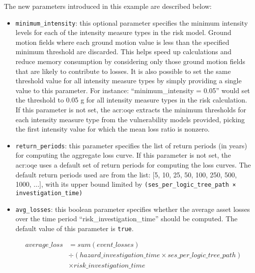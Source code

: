 The new parameters introduced in this example are described below:

\begin{itemize}

  \item \Verb+minimum_intensity+: this optional parameter specifies the minimum
    intensity levels for each of the intensity measure types in the risk model.
    Ground motion fields where each ground motion value is less than the 
    specified minimum threshold are discarded. This helps speed up calculations
    and reduce memory consumption by considering only those ground motion fields
    that are likely to contribute to losses. It is also possible to set the same
    threshold value for all intensity measure types by simply providing a single
    value to this parameter. For instance: ``minimum\_intensity = 0.05'' would
    set the threshold to 0.05 g for all intensity measure types in the risk 
    calculation.
    If this parameter is not set, the \glsdesc{acr:oqe} extracts the minimum
    thresholds for each intensity measure type from the vulnerability
    models provided, picking the first intensity value for which the mean loss
    ratio is nonzero.

  \item \Verb+return_periods+: this parameter specifies the list of return
    periods (in years) for computing the aggregate loss curve.
    If this parameter is not set, the \glsdesc{acr:oqe} uses a default set of
    return periods for computing the loss curves. The default return periods
    used are from the list: [5, 10, 25, 50, 100, 250, 500, 1000, ...], with 
    its upper bound limited by \Verb+(ses_per_logic_tree_path × investigation_time)+

  \item \Verb+avg_losses+: this boolean parameter specifies whether the average
    asset losses over the time period ``risk\_investigation\_time'' should be
    computed. The default value of this parameter is \Verb+true+.

    \begin{equation*}
    \begin{split}
    average\_loss & = sum(event\_losses) \\
                 & \div (hazard\_investigation\_time \times ses\_per\_logic\_tree\_path) \\
                 & \times risk\_investigation\_time
    \end{split}
    \end{equation*}

\end{itemize}

